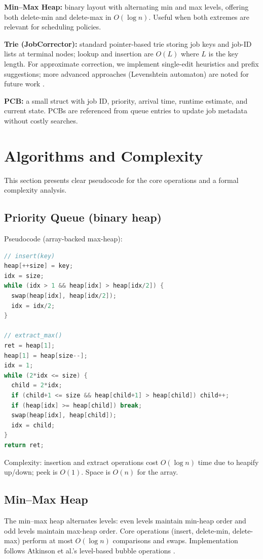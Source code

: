 \documentclass[conference,10pt]{IEEEtran}
\begin{document}
\textbf{Min--Max Heap:} binary layout with alternating min and max levels, offering both delete-min and delete-max in \(O(\log n)\). Useful when both extremes are relevant for scheduling policies.

\textbf{Trie (JobCorrector):} standard pointer-based trie storing job keys and job-ID lists at terminal nodes; lookup and insertion are \(O(L)\) where \(L\) is the key length. For approximate correction, we implement single-edit heuristics and prefix suggestions; more advanced approaches (Levenshtein automaton) are noted for future work \cite{navarro2001approximate}.

\textbf{PCB:} a small struct with job ID, priority, arrival time, runtime estimate, and current state. PCBs are referenced from queue entries to update job metadata without costly searches.

\section{Algorithms and Complexity}
This section presents clear pseudocode for the core operations and a formal complexity analysis.

\subsection{Priority Queue (binary heap)}
Pseudocode (array-backed max-heap):
\begin{lstlisting}[language=C]
// insert(key)
heap[++size] = key;
idx = size;
while (idx > 1 && heap[idx] > heap[idx/2]) {
  swap(heap[idx], heap[idx/2]);
  idx = idx/2;
}

// extract_max()
ret = heap[1];
heap[1] = heap[size--];
idx = 1;
while (2*idx <= size) {
  child = 2*idx;
  if (child+1 <= size && heap[child+1] > heap[child]) child++;
  if (heap[idx] >= heap[child]) break;
  swap(heap[idx], heap[child]);
  idx = child;
}
return ret;
\end{lstlisting}

Complexity: insertion and extract operations cost $O(\log n)$ time due to heapify up/down; peek is $O(1)$. Space is $O(n)$ for the array.

\subsection{Min--Max Heap}
The min--max heap alternates levels: even levels maintain min-heap order and odd levels maintain max-heap order. Core operations (insert, delete-min, delete-max) perform at most $O(\log n)$ comparisons and swaps. Implementation follows Atkinson et al.'s level-based bubble operations \cite{atkinson1986minmax}.
\end{document}
